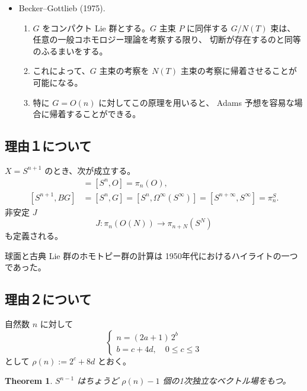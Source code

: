 \documentclass[uplatex,dvipdfmx,a4paper,12pt]{jlreq}
\newtheorem{theorem}{Theorem}
\begin{document}
\begin{itemize}
  \item \cite{BG75} Becker--Gottlieb (1975).
        \begin{enumerate}
          \item $G$ をコンパクト Lie 群とする。$G$ 主束 $P$ に同伴する
                $G/N(T)$ 束は、任意の一般コホモロジー理論を考察する限り、
                切断が存在するのと同等のふるまいをする。
          \item これによって、$G$ 主束の考察を $N(T)$ 主束の考察に帰着させることが可能になる。
          \item 特に $G = O(n)$ に対してこの原理を用いると、
                Adams 予想を容易な場合に帰着することができる。
        \end{enumerate}
\end{itemize}

\subsection{理由１について}

$X = S^{n+1}$ のとき、次が成立する。
\begin{align*}
  [S^{n+1}, BO] &= [S^n, O] = \pi_n(O), \\
  [S^{n+1}, BG] &= [S^n, G]
                = [S^n, \Omega^\infty(S^\infty)]
                = [S^{n+\infty}, S^\infty] = \pi_n^S.
\end{align*}
非安定 $J$
\[
  J : \pi_n(O(N)) \longrightarrow \pi_{n+N}(S^N)
\]
も定義される。

球面と古典 Lie 群のホモトピー群の計算は
1950年代におけるハイライトの一つであった。

\subsection{理由２について}

自然数 $n$ に対して
\[
  \begin{cases}
    n = (2a+1)\, 2^b \\
    b = c + 4d, \quad 0 \leq c \leq 3
  \end{cases}
\]
として $\rho(n) := 2^c + 8d$ とおく。

\begin{theorem}
  $S^{n-1}$ はちょうど $\rho(n) - 1$ 個の1次独立なベクトル場をもつ。
\end{theorem}
\end{document}
